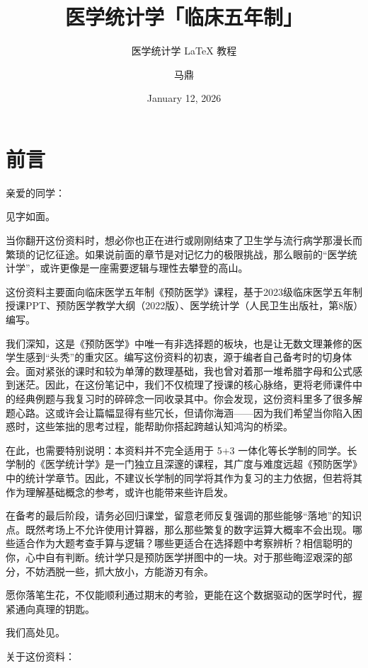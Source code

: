 \documentclass[lang=cn,10pt]{elegantbook}
\title{医学统计学「临床五年制」}
\subtitle{医学统计学 \LaTeX{} 教程}
\author{马鼎}
\date{January 12, 2026}
\institute{白求恩第一临床医学院学业促进会}
\begin{document}
\maketitle
\frontmatter

\tableofcontents

\mainmatter

\chapter*{前言} 

亲爱的同学：

见字如面。

当你翻开这份资料时，想必你也正在进行或刚刚结束了卫生学与流行病学那漫长而繁琐的记忆征途。如果说前面的章节是对记忆力的极限挑战，那么眼前的“医学统计学”，或许更像是一座需要逻辑与理性去攀登的高山。

这份资料主要面向临床医学五年制《预防医学》课程，基于2023级临床医学五年制授课PPT、预防医学教学大纲（2022版）、医学统计学（人民卫生出版社，第8版）编写。

我们深知，这是《预防医学》中唯一有非选择题的板块，也是让无数文理兼修的医学生感到“头秃”的重灾区。编写这份资料的初衷，源于编者自己备考时的切身体会。面对紧张的课时和较为单薄的数理基础，我也曾对着那一堆希腊字母和公式感到迷茫。因此，在这份笔记中，我们不仅梳理了授课的核心脉络，更将老师课件中的经典例题与我复习时的碎碎念一同收录其中。你会发现，这份资料里多了很多解题心路。这或许会让篇幅显得有些冗长，但请你海涵——因为我们希望当你陷入困惑时，这些笨拙的思考过程，能帮助你搭起跨越认知鸿沟的桥梁。

在此，也需要特别说明：本资料并不完全适用于 5+3 一体化等长学制的同学。长学制的《医学统计学》是一门独立且深邃的课程，其广度与难度远超《预防医学》中的统计学章节。因此，不建议长学制的同学将其作为复习的主力依据，但若将其作为理解基础概念的参考，或许也能带来些许启发。

在备考的最后阶段，请务必回归课堂，留意老师反复强调的那些能够“落地”的知识点。既然考场上不允许使用计算器，那么那些繁复的数字运算大概率不会出现。哪些适合作为大题考查手算与逻辑？哪些更适合在选择题中考察辨析？相信聪明的你，心中自有判断。统计学只是预防医学拼图中的一块。对于那些晦涩艰深的部分，不妨洒脱一些，抓大放小，方能游刃有余。

愿你落笔生花，不仅能顺利通过期末的考验，更能在这个数据驱动的医学时代，握紧通向真理的钥匙。

我们高处见。

\vspace{0.2cm}

 关于这份资料：
\end{document}
